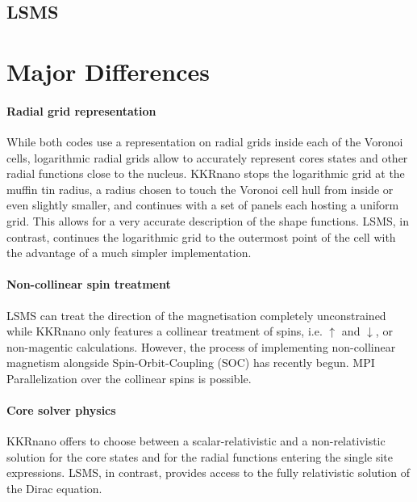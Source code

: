 \documentclass{llncs}
\def\KKRnano{{KKRnano}}
\def\LSMS{{LSMS}}
\begin{document}
\subsection{LSMS} \label{section:lsms}


\section{Major Differences} \label{section:differ}

\paragraph{Radial grid representation}
While both codes use a representation on radial grids inside each of the Voronoi cells,
logarithmic radial grids allow to accurately represent cores states and other radial functions
close to the nucleus. \KKRnano{} stops the logarithmic grid at the muffin tin radius,
a radius chosen to touch the Voronoi cell hull from inside or even slightly smaller, and 
continues with a set of panels each hosting a uniform grid. This allows for a very accurate
description of the shape functions. \LSMS{}, in contrast, continues the logarithmic grid
to the outermost point of the cell with the advantage of a much simpler implementation.

\paragraph{Non-collinear spin treatment}
\LSMS{} can treat the direction of the magnetisation completely unconstrained
while \KKRnano{} only features a collinear treatment of spins, i.e. $\uparrow$ and $\downarrow$, 
or non-magentic calculations. However, the process of implementing non-collinear
magnetism alongside Spin-Orbit-Coupling (SOC) has recently begun.
MPI Parallelization over the collinear spins is possible.

\paragraph{Core solver physics}
\KKRnano{} offers to choose between a scalar-relativistic and a non-relativistic solution for the core states 
and for the radial functions entering the single site expressions. 
\LSMS{}, in contrast, provides access to the fully relativistic solution of the Dirac equation.
%
\end{document}
